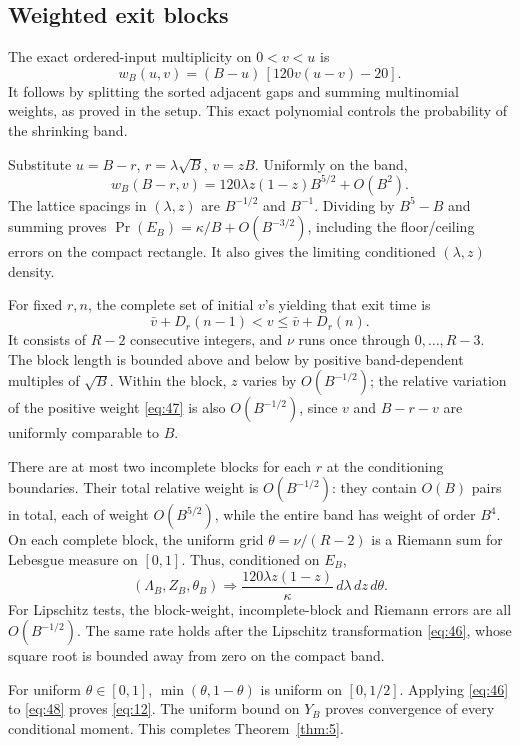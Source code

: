 \documentclass[11pt]{amsart}
\begin{document}
\subsection{Weighted exit blocks}

The exact ordered-input multiplicity on \(0<v<u\) is \begin{equation}\label{eq:47}
w_B(u,v)=(B-u)\,[120v(u-v)-20].
\end{equation} It follows by splitting the sorted adjacent gaps and summing multinomial weights, as proved in the setup. This exact polynomial controls the probability of the shrinking band.

Substitute \(u=B-r\), \(r=\lambda\sqrt B\), \(v=zB\). Uniformly on the band, \[w_B(B-r,v)=120\lambda z(1-z)B^{5/2}+O(B^2).\] The lattice spacings in \((\lambda,z)\) are \(B^{-1/2}\) and \(B^{-1}\). Dividing by \(B^5-B\) and summing proves \(\Pr(E_B)=\kappa/B+O(B^{-3/2})\), including the floor/ceiling errors on the compact rectangle. It also gives the limiting conditioned \((\lambda,z)\) density.

For fixed \(r,n\), the complete set of initial \(v\)'s yielding that exit time is \[\bar v+D_r(n-1)<v\le \bar v+D_r(n).\] It consists of \(R-2\) consecutive integers, and \(\nu\) runs once through \(0,\ldots,R-3\). The block length is bounded above and below by positive band-dependent multiples of \(\sqrt B\). Within the block, \(z\) varies by \(O(B^{-1/2})\); the relative variation of the positive weight \eqref{eq:47} is also \(O(B^{-1/2})\), since \(v\) and \(B-r-v\) are uniformly comparable to \(B\).

There are at most two incomplete blocks for each \(r\) at the conditioning boundaries. Their total relative weight is \(O(B^{-1/2})\): they contain \(O(B)\) pairs in total, each of weight \(O(B^{5/2})\), while the entire band has weight of order \(B^4\). On each complete block, the uniform grid \(\theta=\nu/(R-2)\) is a Riemann sum for Lebesgue measure on \([0,1]\). Thus, conditioned on \(E_B\), \begin{equation}\label{eq:48}
(\Lambda_B,Z_B,\theta_B)\Rightarrow
 \frac{120\lambda z(1-z)}{\kappa}\,d\lambda\,dz\,d\theta.
\end{equation} For Lipschitz tests, the block-weight, incomplete-block and Riemann errors are all \(O(B^{-1/2})\). The same rate holds after the Lipschitz transformation \eqref{eq:46}, whose square root is bounded away from zero on the compact band.

For uniform \(\theta\in[0,1]\), \(\min(\theta,1-\theta)\) is uniform on \([0,1/2]\). Applying \eqref{eq:46} to \eqref{eq:48} proves \eqref{eq:12}. The uniform bound on \(Y_B\) proves convergence of every conditional moment. This completes Theorem~\ref{thm:5}.
\end{document}
